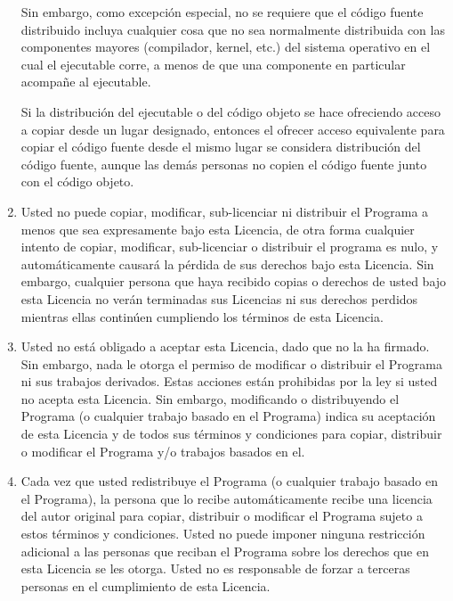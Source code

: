 \begin{enumerate}
Sin embargo, como excepción especial, no se requiere que el código fuente distribuido incluya cualquier cosa que no sea normalmente distribuida con las componentes mayores (compilador, kernel, etc.) del sistema operativo en el cual el ejecutable corre, a menos de que una componente en particular acompañe al ejecutable. 

Si la distribución del ejecutable o del código objeto se hace ofreciendo acceso a copiar desde un lugar designado, entonces el ofrecer acceso equivalente para copiar el código fuente desde el mismo lugar se considera distribución del código fuente, aunque las demás personas no copien el código fuente junto con el código objeto. 

\item Usted no puede copiar, modificar, sub-licenciar ni distribuir el Programa a menos que sea expresamente bajo esta Licencia, de otra forma cualquier intento de copiar, modificar, sub-licenciar o distribuir el programa es nulo, y automáticamente causará la pérdida de sus derechos bajo esta Licencia. Sin embargo, cualquier persona que haya recibido copias o derechos de usted bajo esta Licencia no verán terminadas sus Licencias ni sus derechos perdidos mientras ellas continúen cumpliendo los términos de esta Licencia. 

\item Usted no está obligado a aceptar esta Licencia, dado que no la ha firmado. Sin embargo, nada le otorga el permiso de modificar o distribuir el Programa ni sus trabajos derivados. Estas acciones están prohibidas por la ley si usted no acepta esta Licencia. Sin embargo, modificando o distribuyendo el Programa (o cualquier trabajo basado en el Programa) indica su aceptación de esta Licencia y de todos sus términos y condiciones para copiar, distribuir o modificar el Programa y/o trabajos basados en el. 

\item Cada vez que usted redistribuye el Programa (o cualquier trabajo basado en el Programa), la persona que lo recibe automáticamente recibe una licencia del autor original para copiar, distribuir o modificar el Programa sujeto a estos términos y condiciones. Usted no puede imponer ninguna restricción adicional a las personas que reciban el Programa sobre los derechos que en esta Licencia se les otorga. Usted no es responsable de forzar a terceras personas en el cumplimiento de esta Licencia. 


\end{enumerate}
